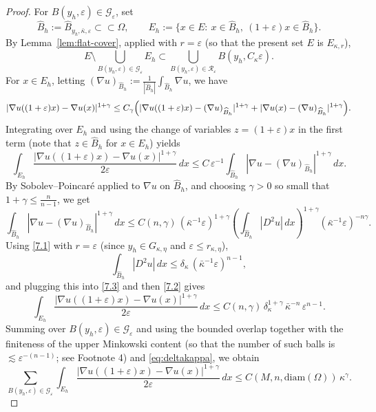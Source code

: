 \documentclass[reqno,11pt]{amsart}
\numberwithin{equation}{section}
\theoremstyle{remark}
\begin{document}
\begin{proof}
{For $B(y_h,\varepsilon)\in\mathcal G_\varepsilon$, set}
\[
{
\widehat B_h:=\widehat B_{y_h,\bar\kappa,\varepsilon}\subset\subset\Omega,\qquad
E_h:=\{x\in E:\ x\in \widehat B_h,\ (1+\varepsilon)x\in \widehat B_h\}.
}
\]
{By Lemma~\ref{lem:flat-cover}, applied with $r=\varepsilon$ (so that the present set $E$ is $E_{\kappa,r}$),}
\[
{
E\setminus\bigcup_{B(y_h,\varepsilon)\in\mathcal G_\varepsilon}E_h
\subset
\bigcup_{B(y_h,\varepsilon)\in\mathcal R_\varepsilon}B(y_h,C_\kappa\varepsilon).
}
\]
		{For $x\in E_h$, letting $(\nabla u)_{\widehat B_h}:=\frac{1}{|\widehat B_h|}\int_{\widehat B_h}\nabla u$,
		we have}
\[
|\nabla u((1+\varepsilon)x)-\nabla u(x)|^{1+\gamma}
\le C_\gamma\Bigl(|\nabla u((1+\varepsilon)x)-(\nabla u)_{\widehat B_h}|^{1+\gamma}
+|\nabla u(x)-(\nabla u)_{\widehat B_h}|^{1+\gamma}\Bigr).
\]
Integrating over $E_h$ and using the change of variables $z=(1+\varepsilon)x$ in the first term
(note that $z\in\widehat B_h$ for $x\in E_h$) yields
\begin{equation}\label{7.2}
\int_{E_h}\frac{|\nabla u((1+\varepsilon)x)-\nabla u(x)|^{1+\gamma}}{2\varepsilon}\,dx
\le C\,\varepsilon^{-1}\int_{\widehat B_h}|\nabla u-(\nabla u)_{\widehat B_h}|^{1+\gamma}\,dx.
\end{equation}
By Sobolev--Poincar\'e applied to $\nabla u$ on $\widehat B_h$, and choosing
$\gamma>0$ so small that $1+\gamma\le \frac{n}{n-1}$, we get
\begin{equation}\label{7.3}
\int_{\widehat B_h}|\nabla u-(\nabla u)_{\widehat B_h}|^{1+\gamma}\,dx
\le {C(n,\gamma)\,(\bar\kappa^{-1}\varepsilon)^{1+\gamma}
\left(\int_{\widehat B_h}|D^2u|\,dx\right)^{1+\gamma}(\bar\kappa^{-1}\varepsilon)^{-n\gamma}.}
\end{equation}
Using \eqref{7.1} with $r=\varepsilon$ (since $y_h\in G_{\kappa,\eta}$ and $\varepsilon\le r_{\kappa,\eta}$),
\[
{
\int_{\widehat B_h}|D^2u|\,dx \le \delta_\kappa\,(\bar\kappa^{-1}\varepsilon)^{n-1},
}
\]
and plugging this into \eqref{7.3} and then \eqref{7.2} gives
\[
{
\int_{E_h}\frac{|\nabla u((1+\varepsilon)x)-\nabla u(x)|^{1+\gamma}}{2\varepsilon}\,dx
\le C(n,\gamma)\,\delta_\kappa^{1+\gamma}\,\bar\kappa^{-n}\,\varepsilon^{n-1}.
}
\]
{Summing over $B(y_h,\varepsilon)\in\mathcal G_\varepsilon$} and using the bounded overlap together with
the finiteness of the upper Minkowski content (so that the number of such balls is
{$\lesssim \varepsilon^{-(n-1)}$; see Footnote 4}) and \eqref{eq:deltakappa}, we obtain
\begin{equation}\label{2.8}
\sum_{B(y_h,\varepsilon)\in\mathcal G_\varepsilon}
\int_{E_h}\frac{|\nabla u((1+\varepsilon)x)-\nabla u(x)|^{1+\gamma}}{2\varepsilon}\,dx
\le {C(M,n,\mathrm{diam}(\Omega))\,\kappa^\gamma.}
\end{equation}


\end{proof}
\end{document}
